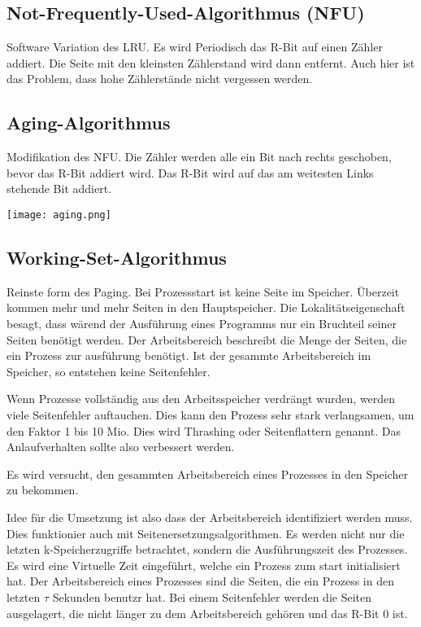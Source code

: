 \subsection{Not-Frequently-Used-Algorithmus (NFU)}

Software Variation des LRU. Es wird Periodisch das R-Bit auf einen Zähler addiert. Die Seite mit den kleinsten Zählerstand wird dann entfernt. Auch hier ist das Problem, dass hohe Zählerstände nicht vergessen werden.

\subsection{Aging-Algorithmus}

Modifikation des NFU. Die Zähler werden alle ein Bit nach rechts geschoben, bevor das R-Bit addiert wird. Das R-Bit wird auf das am weitesten Links stehende Bit addiert.

\texttt{[image: aging.png]}

\subsection{Working-Set-Algorithmus}

Reinste form des Paging. Bei Prozessstart ist keine Seite im Speicher. Überzeit kommen mehr und mehr Seiten in den Hauptspeicher. Die Lokalitätseigenschaft besagt, dass wärend der Ausführung eines Programms nur ein Bruchteil seiner Seiten benötigt werden. Der Arbeitsbereich beschreibt die Menge der Seiten, die ein Prozess zur ausführung benötigt. Ist der gesammte Arbeitsbereich im Speicher, so entstehen keine Seitenfehler.

Wenn Prozesse vollständig aus den Arbeitsspeicher verdrängt wurden, werden viele Seitenfehler auftauchen. Dies kann den Prozess sehr stark verlangsamen, um den Faktor 1 bis 10 Mio. Dies wird Thrashing oder Seitenflattern genannt. Das Anlaufverhalten sollte also verbessert werden.

Es wird versucht, den gesammten Arbeitsbereich eines Prozesses in den Speicher zu bekommen. 

Idee für die Umsetzung ist also dass der Arbeitsbereich identifiziert werden muss. Dies funktionier auch mit Seitenersetzungsalgorithmen. Es werden nicht nur die letzten k-Speicherzugriffe betrachtet, sondern die Ausführungszeit des Prozesses. Es wird eine Virtuelle Zeit eingeführt, welche ein Prozess zum start initialisiert hat. Der Arbeitsbereich eines Prozesses sind die Seiten, die ein Prozess in den letzten $\tau$ Sekunden benutzr hat. Bei einem Seitenfehler werden die Seiten ausgelagert, die nicht länger zu dem Arbeitsbereich gehören und das R-Bit 0 ist. 

